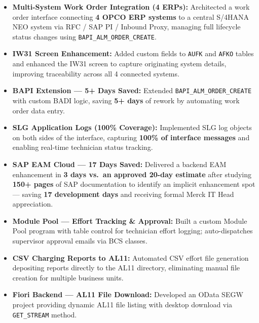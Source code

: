 \documentclass[10pt, a4paper]{article}
\begin{document}
\begin{itemize}
  \item \textbf{Multi-System Work Order Integration (4 ERPs):}
        Architected a work order interface connecting \textbf{4 OPCO ERP systems}
        to a central S/4HANA NEO system via RFC / SAP PI / Inbound Proxy,
        managing full lifecycle status changes using \texttt{BAPI\_ALM\_ORDER\_CREATE}.

  \item \textbf{IW31 Screen Enhancement:}
        Added custom fields to \texttt{AUFK} and \texttt{AFKO} tables and enhanced
        the IW31 screen to capture originating system details, improving
        traceability across all 4 connected systems.

  \item \textbf{BAPI Extension --- 5+ Days Saved:}
        Extended \texttt{BAPI\_ALM\_ORDER\_CREATE} with custom BADI logic,
        saving \textbf{5+ days} of rework by automating work order data entry.

  \item \textbf{SLG Application Logs (100\% Coverage):}
        Implemented SLG log objects on both sides of the interface, capturing
        \textbf{100\% of interface messages} and enabling real-time technician
        status tracking.

  \item \textbf{SAP EAM Cloud --- 17 Days Saved:}
        Delivered a backend EAM enhancement in \textbf{3 days vs.\ an approved
        20-day estimate} after studying \textbf{150+ pages} of SAP documentation
        to identify an implicit enhancement spot --- saving \textbf{17 development
        days} and receiving formal Merck IT Head appreciation.

  \item \textbf{Module Pool --- Effort Tracking \& Approval:}
        Built a custom Module Pool program with table control for technician effort
        logging; auto-dispatches supervisor approval emails via BCS classes.

  \item \textbf{CSV Charging Reports to AL11:}
        Automated CSV effort file generation depositing reports directly to the
        AL11 directory, eliminating manual file creation for multiple business units.

  \item \textbf{Fiori Backend --- AL11 File Download:}
        Developed an OData SEGW project providing dynamic AL11 file listing with
        desktop download via \texttt{GET\_STREAM} method.
\end{itemize}
\end{document}
